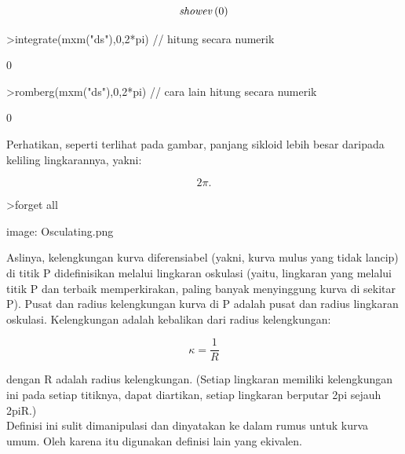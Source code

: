 \documentclass[a4paper,10pt]{article}
\begin{document}
\begin{eulernotebook}
\begin{eulercomment}
\begin{eulercomment}
\begin{eulercomment}
\begin{eulercomment}
\begin{eulerformula}
\[
{\it showev}\left(0\right)
\]
\end{eulerformula}
\begin{eulerprompt}
>integrate(mxm("ds"),0,2*pi) // hitung secara numerik
\end{eulerprompt}
\begin{euleroutput}
  0
\end{euleroutput}
\begin{eulerprompt}
>romberg(mxm("ds"),0,2*pi) // cara lain hitung secara numerik
\end{eulerprompt}
\begin{euleroutput}
  0
\end{euleroutput}
\begin{eulercomment}
Perhatikan, seperti terlihat pada gambar, panjang sikloid lebih besar daripada keliling lingkarannya, yakni:

\end{eulercomment}
\begin{eulerformula}
\[
2\pi.
\]
\end{eulerformula}
\begin{eulerprompt}
>forget all
\end{eulerprompt}
\begin{eulercomment}
image: Osculating.png

Aslinya, kelengkungan kurva diferensiabel (yakni, kurva mulus yang
tidak lancip) di titik P didefinisikan melalui lingkaran oskulasi
(yaitu, lingkaran yang melalui titik P dan terbaik memperkirakan,
paling banyak menyinggung kurva di sekitar P). Pusat dan radius
kelengkungan kurva di P adalah pusat dan radius lingkaran oskulasi.
Kelengkungan adalah kebalikan dari radius kelengkungan:

\end{eulercomment}
\begin{eulerformula}
\[
\kappa =\frac {1}{R}
\]
\end{eulerformula}
\begin{eulercomment}
dengan R adalah radius kelengkungan. (Setiap lingkaran memiliki
kelengkungan ini pada setiap titiknya, dapat diartikan, setiap
lingkaran berputar 2pi sejauh 2piR.)\\
Definisi ini sulit dimanipulasi dan dinyatakan ke dalam rumus untuk
kurva umum. Oleh karena itu digunakan definisi lain yang ekivalen.


\end{eulercomment}
\end{eulercomment}
\end{eulercomment}
\end{eulercomment}
\end{eulercomment}
\end{eulernotebook}
\end{document}
